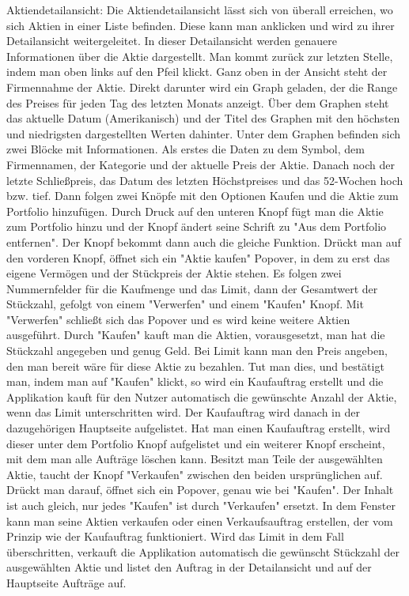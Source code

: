 \documentclass[10pt]{scrartcl}
\begin{document}
Aktiendetailansicht:
Die Aktiendetailansicht lässt sich von überall erreichen, wo sich Aktien in einer Liste befinden. Diese kann man anklicken und wird zu ihrer Detailansicht weitergeleitet. In dieser Detailansicht werden genauere Informationen über die Aktie dargestellt. Man kommt zurück zur letzten Stelle, indem man oben links auf den Pfeil klickt.
Ganz oben in der Ansicht steht der Firmennahme der Aktie. Direkt darunter wird ein Graph geladen, der die Range des Preises für jeden Tag des letzten Monats anzeigt. Über dem Graphen steht das aktuelle Datum (Amerikanisch) und der Titel des Graphen mit den höchsten und niedrigsten dargestellten Werten dahinter. 
Unter dem Graphen befinden sich zwei Blöcke mit Informationen. Als erstes die Daten zu dem Symbol, dem Firmennamen, der Kategorie und der aktuelle Preis der Aktie. Danach noch der letzte Schließpreis, das Datum des letzten Höchstpreises und das 52-Wochen hoch bzw. tief.
Dann folgen zwei Knöpfe mit den Optionen Kaufen und die Aktie zum Portfolio hinzufügen.
Durch Druck auf den unteren Knopf fügt man die Aktie zum Portfolio hinzu und der Knopf ändert seine Schrift zu "Aus dem Portfolio entfernen". Der Knopf bekommt dann auch die gleiche Funktion.
Drückt man auf den vorderen Knopf, öffnet sich ein "Aktie kaufen" Popover, in dem zu erst das eigene Vermögen und der Stückpreis der Aktie stehen. Es folgen zwei Nummernfelder für die Kaufmenge und das Limit, dann der Gesamtwert der Stückzahl, gefolgt von einem "Verwerfen" und einem "Kaufen" Knopf. Mit "Verwerfen" schließt sich das Popover und es wird keine weitere Aktien ausgeführt. Durch "Kaufen" kauft man die Aktien, vorausgesetzt, man hat die Stückzahl angegeben und genug Geld. Bei Limit kann man den Preis angeben, den man bereit wäre für diese Aktie zu bezahlen. Tut man dies, und bestätigt man, indem man auf "Kaufen" klickt, so wird ein Kaufauftrag erstellt und die Applikation kauft für den Nutzer automatisch die gewünschte Anzahl der Aktie, wenn das Limit unterschritten wird. Der Kaufauftrag wird danach in der dazugehörigen Hauptseite aufgelistet. Hat man einen Kaufauftrag erstellt, wird dieser unter dem Portfolio Knopf aufgelistet und ein weiterer Knopf erscheint, mit dem man alle Aufträge löschen kann.
Besitzt man Teile der ausgewählten Aktie, taucht der Knopf "Verkaufen" zwischen den beiden ursprünglichen auf. Drückt man darauf, öffnet sich ein Popover, genau wie bei "Kaufen". Der Inhalt ist auch gleich, nur jedes "Kaufen" ist durch "Verkaufen" ersetzt. In dem Fenster kann man seine Aktien verkaufen oder einen Verkaufsauftrag erstellen, der vom Prinzip wie der Kaufauftrag funktioniert. Wird das Limit in dem Fall überschritten, verkauft die Applikation automatisch die gewünscht Stückzahl der ausgewählten Aktie und listet den Auftrag in der Detailansicht und auf der Hauptseite Aufträge auf.
\end{document}
